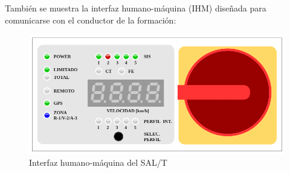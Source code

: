 También se muestra la interfaz humano-máquina (IHM) diseñada para comunicarse con el conductor de la formación:

\begin{figure}[H]
    \centering
    \includegraphics[width=\linewidth]{img/panel_frontal.png}
    \caption{Interfaz humano-máquina del SAL/T}
    \label{fig:him}
\end{figure}